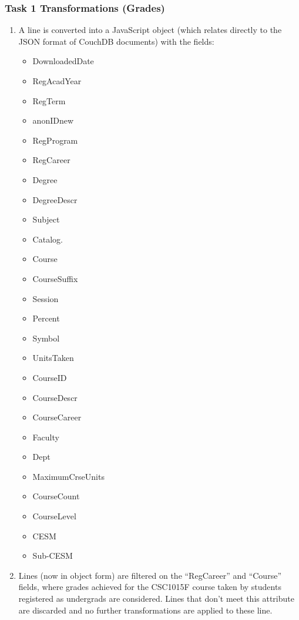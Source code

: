 \subsubsection{Task 1 Transformations (Grades)}
\begin{enumerate}
    \item A line is converted into a JavaScript object (which relates directly to the JSON format of CouchDB documents) with the fields:
          \begin{itemize}
              \item DownloadedDate
              \item RegAcadYear
              \item RegTerm
              \item anonIDnew
              \item RegProgram
              \item RegCareer
              \item Degree
              \item DegreeDescr
              \item Subject
              \item Catalog.
              \item Course
              \item CourseSuffix
              \item Session
              \item Percent
              \item Symbol
              \item UnitsTaken
              \item CourseID
              \item CourseDescr
              \item CourseCareer
              \item Faculty
              \item Dept
              \item MaximumCrseUnits
              \item CourseCount
              \item CourseLevel
              \item CESM
              \item Sub-CESM
          \end{itemize}
    \item Lines (now in object form) are filtered on the ``RegCareer'' and ``Course'' fields, where grades achieved for the CSC1015F course taken by students registered as undergrads are considered. Lines that don't meet this attribute are discarded and no further transformations are applied to these line.

\end{enumerate}
